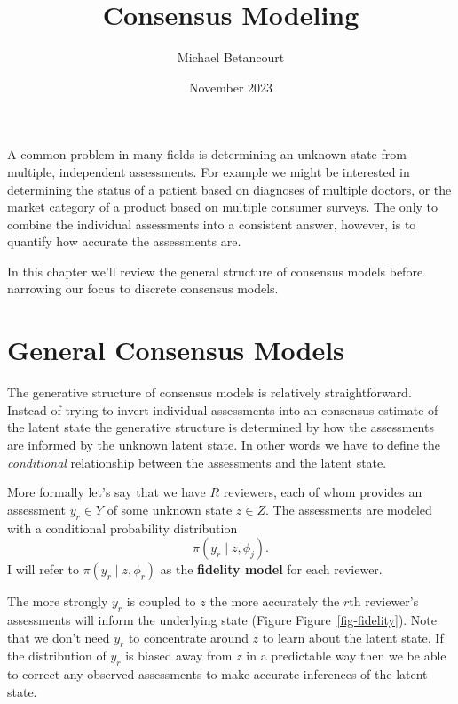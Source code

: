 \documentclass[
  letterpaper,
  DIV=11,
  numbers=noendperiod]{scrartcl}
\title{Consensus Modeling}
\author{Michael Betancourt}
\date{November 2023}
\renewcommand*\contentsname{Table of contents}
\newcommand\contentsname{Table of contents}
\begin{document}
\maketitle
\ifdefined\Shaded\renewenvironment{Shaded}{\begin{tcolorbox}[interior hidden, boxrule=0pt, frame hidden, breakable, sharp corners, borderline west={3pt}{0pt}{shadecolor}, enhanced]}{\end{tcolorbox}}\fi

\renewcommand*\contentsname{Table of contents}
{
\hypersetup{linkcolor=}
\setcounter{tocdepth}{3}
\tableofcontents
}
A common problem in many fields is determining an unknown state from
multiple, independent assessments. For example we might be interested in
determining the status of a patient based on diagnoses of multiple
doctors, or the market category of a product based on multiple consumer
surveys. The only to combine the individual assessments into a
consistent answer, however, is to quantify how accurate the assessments
are.

In this chapter we'll review the general structure of consensus models
before narrowing our focus to discrete consensus models.

\hypertarget{general-consensus-models}{%
\section{General Consensus Models}\label{general-consensus-models}}

The generative structure of consensus models is relatively
straightforward. Instead of trying to invert individual assessments into
an consensus estimate of the latent state the generative structure is
determined by how the assessments are informed by the unknown latent
state. In other words we have to define the \emph{conditional}
relationship between the assessments and the latent state.

More formally let's say that we have \(R\) reviewers, each of whom
provides an assessment \(y_{r} \in Y\) of some unknown state
\(z \in Z\). The assessments are modeled with a conditional probability
distribution \[
\pi( y_{r} \mid z, \phi_{j} ).
\] I will refer to \(\pi( y_{r} \mid z, \phi_{r} )\) as the
\textbf{fidelity model} for each reviewer.

The more strongly \(y_{r}\) is coupled to \(z\) the more accurately the
\(r\)th reviewer's assessments will inform the underlying state (Figure
Figure~\ref{fig-fidelity}). Note that we don't need \(y_{r}\) to
concentrate around \(z\) to learn about the latent state. If the
distribution of \(y_{r}\) is biased away from \(z\) in a predictable way
then we be able to correct any observed assessments to make accurate
inferences of the latent state.
\end{document}
